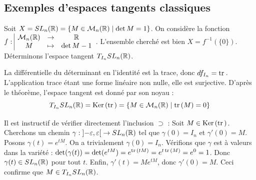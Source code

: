 \subsection{Exemples d'espaces tangents classiques}

\begin{exemple}[title=Espace tangent au groupe spécial linéaire]
    Soit $X = SL_n(\mathbb{R}) = \{M \in \mathcal{M}_n(\mathbb{R}) \mid \det M = 1\}$.
    On considère la fonction $f: \space \begin{array}{|ccc} \displaystyle \mathcal{M}_n(\mathbb{R}) & \to & \displaystyle \mathbb{R} \\ \displaystyle M & \mapsto & \displaystyle \det M - 1 \end{array}$. L'ensemble cherché est bien $X = f^{-1}(\{0\})$.
    Déterminons l'espace tangent $T_{I_n} SL_n(\mathbb{R})$.

    La différentielle du déterminant en l'identité est la trace, donc $df_{I_n} = \operatorname{tr} \,$.
    L'application trace étant une forme linéaire non nulle, elle est surjective.
    D'après le théorème, l'espace tangent est donné par son noyau :
    \[ T_{I_n} SL_n(\mathbb{R}) = \operatorname{Ker} \,(\operatorname{tr} \,) = \{M \in \mathcal{M}_n(\mathbb{R}) \mid \operatorname{tr} \,(M) = 0\} \]

    \lvspace \avspace {}
    
    Il est instructif de vérifier directement l'inclusion $\supset$ :
    Soit $M \in \operatorname{Ker} \,(\operatorname{tr} \,)$. Cherchons un chemin $\gamma : \left]-\varepsilon, \varepsilon\right[ \to SL_n(\mathbb{R})$ tel que $\gamma(0) = I_n$ et $\gamma'(0) = M$.
    Posons $\gamma(t) = e^{tM}$. On a trivialement $\gamma(0) = I_n$.
    Vérifions que $\gamma$ est à valeurs dans la variété : $\det(\gamma(t)) = \det(e^{tM}) = e^{\operatorname{tr} \,(tM)} = e^{t\operatorname{tr} \,(M)} = e^0 = 1$. Donc $\gamma(t) \in SL_n(\mathbb{R})$ pour tout $t$.
    Enfin, $\gamma'(t) = M e^{tM}$, donc $\gamma'(0) = M$.
    Ceci confirme que $M \in T_{I_n} SL_n(\mathbb{R})$.
\end{exemple}

